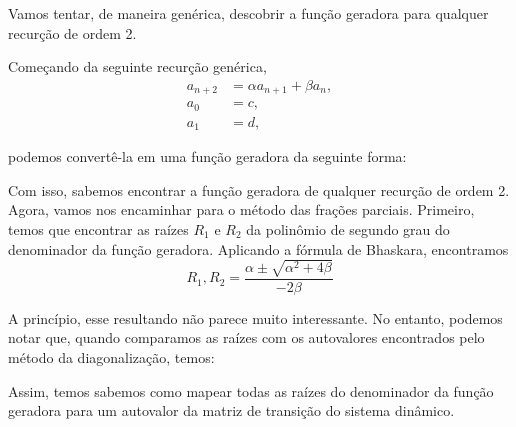 Vamos tentar, de maneira genérica, descobrir a função geradora para qualquer recurção de ordem 2.

Começando da seguinte recurção genérica,
\begin{align*}
  a_{n+2} &= \alpha a_{n+1} + \beta a_{n}, \\
  a_0 &= c, \\
  a_1 &= d,
\end{align*}

podemos convertê-la em uma função geradora da seguinte forma:
\begin{calcproof}[.]
\end{calcproof}

Com isso, sabemos encontrar a função geradora de qualquer recurção de ordem 2. Agora, vamos nos encaminhar para o método das frações parciais. Primeiro, temos que encontrar as raízes $R_1$ e $R_2$ da polinômio de segundo grau do denominador da função geradora. Aplicando a fórmula de Bhaskara, encontramos
\[
  R_1, R_2 = \dfrac{\alpha \pm \sqrt{\alpha^2 + 4 \beta}}{-2 \beta}
\]

A princípio, esse resultando não parece muito interessante. No entanto, podemos notar que, quando comparamos as raízes com os autovalores encontrados pelo método da diagonalização, temos:
\begin{calcproof}
\end{calcproof}

Assim, temos sabemos como mapear todas as raízes do denominador da função geradora para um autovalor da matriz de transição do sistema dinâmico.

